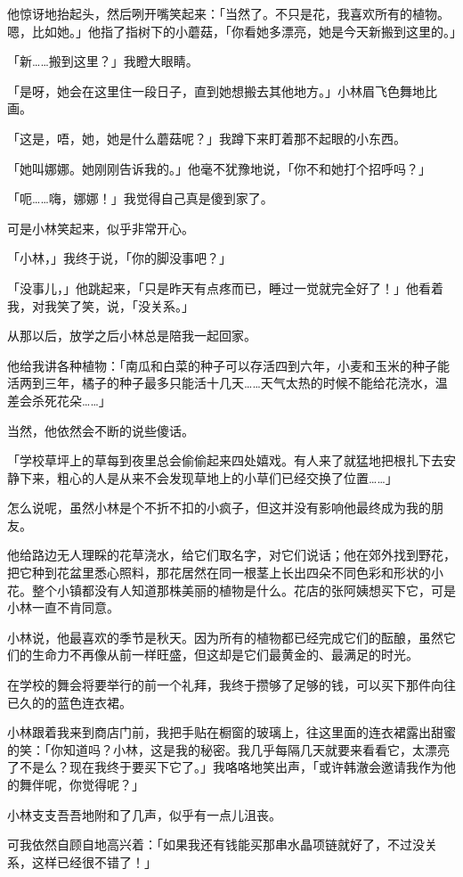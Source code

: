 \documentclass[UTF8]{ctexart}
\begin{document}
他惊讶地抬起头，然后咧开嘴笑起来：「当然了。不只是花，我喜欢所有的植物。嗯，比如她。」他指了指树下的小蘑菇，「你看她多漂亮，她是今天新搬到这里的。」

「新……搬到这里？」我瞪大眼睛。

「是呀，她会在这里住一段日子，直到她想搬去其他地方。」小林眉飞色舞地比画。

「这是，唔，她，她是什么蘑菇呢？」我蹲下来盯着那不起眼的小东西。

「她叫娜娜。她刚刚告诉我的。」他毫不犹豫地说，「你不和她打个招呼吗？」

「呃……嗨，娜娜！」我觉得自己真是傻到家了。

可是小林笑起来，似乎非常开心。

「小林，」我终于说，「你的脚没事吧？」

「没事儿，」他跳起来，「只是昨天有点疼而已，睡过一觉就完全好了！」他看着我，对我笑了笑，说，「没关系。」

从那以后，放学之后小林总是陪我一起回家。

他给我讲各种植物：「南瓜和白菜的种子可以存活四到六年，小麦和玉米的种子能活两到三年，橘子的种子最多只能活十几天……天气太热的时候不能给花浇水，温差会杀死花朵……」

当然，他依然会不断的说些傻话。

「学校草坪上的草每到夜里总会偷偷起来四处嬉戏。有人来了就猛地把根扎下去安静下来，粗心的人是从来不会发现草地上的小草们已经交换了位置……」

怎么说呢，虽然小林是个不折不扣的小疯子，但这并没有影响他最终成为我的朋友。

他给路边无人理睬的花草浇水，给它们取名字，对它们说话；他在郊外找到野花，把它种到花盆里悉心照料，那花居然在同一根茎上长出四朵不同色彩和形状的小花。整个小镇都没有人知道那株美丽的植物是什么。花店的张阿姨想买下它，可是小林一直不肯同意。

小林说，他最喜欢的季节是秋天。因为所有的植物都已经完成它们的酝酿，虽然它们的生命力不再像从前一样旺盛，但这却是它们最黄金的、最满足的时光。

在学校的舞会将要举行的前一个礼拜，我终于攒够了足够的钱，可以买下那件向往已久的的蓝色连衣裙。

小林跟着我来到商店门前，我把手贴在橱窗的玻璃上，往这里面的连衣裙露出甜蜜的笑：「你知道吗？小林，这是我的秘密。我几乎每隔几天就要来看看它，太漂亮了不是么？现在我终于要买下它了。」我咯咯地笑出声，「或许韩澈会邀请我作为他的舞伴呢，你觉得呢？」

小林支支吾吾地附和了几声，似乎有一点儿沮丧。

可我依然自顾自地高兴着：「如果我还有钱能买那串水晶项链就好了，不过没关系，这样已经很不错了！」
\end{document}
